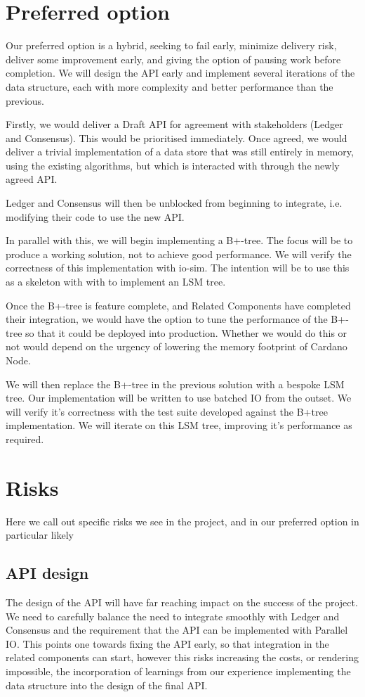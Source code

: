 \documentclass[11pt,a4paper]{article}
\begin{document}
\section{Preferred option}
\label{preferred}

Our preferred option is a hybrid, seeking to fail early, minimize delivery risk,
deliver some improvement early, and giving the option of pausing work before
completion. We will design the API early and implement several iterations of the
data structure, each with more complexity and better performance than the
previous.

Firstly, we would deliver a Draft API for agreement with stakeholders (Ledger
and Consensus). This would be prioritised immediately. Once agreed, we would
deliver a trivial implementation of a data store that was still entirely in
memory, using the existing algorithms, but which is interacted with through the
newly agreed API.

Ledger and Consensus will then be unblocked from beginning to integrate, i.e.
modifying their code to use the new API.

In parallel with this, we will begin implementing a B+-tree. The focus will
be to produce a working solution, not to achieve good performance. We
will verify the correctness of this implementation with io-sim. The intention
will be to use this as a skeleton with with to implement an LSM tree.

Once the B+-tree is feature complete, and Related Components have completed
their integration, we would have the option to tune the performance of the
B+-tree so that it could be deployed into production. Whether we would do this
or not would depend on the urgency of lowering the memory footprint of Cardano
Node.

We will then replace the B+-tree in the previous solution with a bespoke LSM tree.
Our implementation will be written to use batched IO from the outset. We will
verify it's correctness with the test suite developed against the B+tree
implementation. We will iterate on this LSM tree, improving it's performance
as required.

\section{Risks}

Here we call out specific risks we see in the project, and in our preferred option in particular
likely

\subsection{API design}
The design of the API will have far reaching impact on the success of the
project. We need to carefully balance the need to integrate smoothly with Ledger
and Consensus and the requirement that the API can be implemented with Parallel
IO. This points one towards fixing the API early, so that integration in the
related components can start, however this risks increasing the costs, or
rendering impossible, the incorporation of learnings from our experience
implementing the data structure into the design of the final API.
\end{document}
